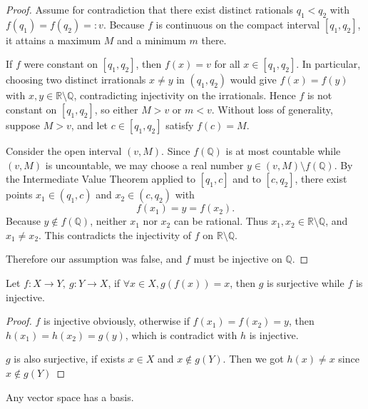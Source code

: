 \begin{proof}
Assume for contradiction that there exist distinct rationals $q_1<q_2$ with
$f(q_1)=f(q_2)=:v$. Because $f$ is continuous on the compact interval $[q_1,q_2]$,
it attains a maximum $M$ and a minimum $m$ there.

If $f$ were constant on $[q_1,q_2]$, then $f(x)=v$ for all $x\in[q_1,q_2]$.
In particular, choosing two distinct irrationals $x\neq y$ in $(q_1,q_2)$ would give
$f(x)=f(y)$ with $x,y\in\mathbb{R}\setminus\mathbb{Q}$, contradicting injectivity on
the irrationals. Hence $f$ is not constant on $[q_1,q_2]$, so either $M>v$ or $m<v$.
Without loss of generality, suppose $M>v$, and let $c\in[q_1,q_2]$ satisfy $f(c)=M$.

Consider the open interval $(v,M)$. Since $f(\mathbb{Q})$ is at most countable while $(v,M)$
is uncountable, we may choose a real number $y\in(v,M)\setminus f(\mathbb{Q})$.
By the Intermediate Value Theorem applied to $[q_1,c]$ and to $[c,q_2]$, there exist points
$x_1\in(q_1,c)$ and $x_2\in(c,q_2)$ with
\[
f(x_1)=y=f(x_2).
\]
Because $y\notin f(\mathbb{Q})$, neither $x_1$ nor $x_2$ can be rational.
Thus $x_1,x_2\in\mathbb{R}\setminus\mathbb{Q}$, and $x_1\neq x_2$.
This contradicts the injectivity of $f$ on $\mathbb{R}\setminus\mathbb{Q}$.

Therefore our assumption was false, and $f$ must be injective on $\mathbb{Q}$.
\end{proof}

\begin{exercise}
    Let $f: X \to Y,\: g: Y \to X$, if $\forall x \in X, g(f(x)) = x$, then $g$ is surjective 
    while $f$ is injective.
\end{exercise}

\begin{proof}
   $f$ is injective obviously, otherwise if $f(x_1) = f(x_2) = y$, then $h(x_1) = h(x_2) = g(y)$, which is contradict with
   $h$ is injective.

   $g$ is also surjective, if exists $x \in X$ and $x \notin g(Y)$. Then we got $h(x) \ne x$ since $x \notin g(Y)$
\end{proof}

\begin{exercise}
    Any vector space has a basis.
\end{exercise}

